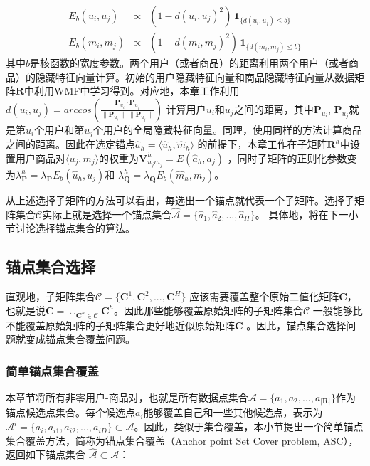 \begin{eqnarray}
	\mathit{E_{b}}(u_i, u_j)&\varpropto&(1-d(u_i,u_j)^2) \,\mathbf{1}_{\{d(u_i,u_j)\leq {b}\}}\nonumber\\
	\mathit{E_{b}}(m_i, m_j)&\varpropto&(1-d(m_i,m_j)^2) \,\mathbf{1}_{\{d(m_i,m_j)\leq {b}\}}\nonumber
\end{eqnarray}
其中$b$是核函数的宽度参数。两个用户（或者商品）的距离利用两个用户（或者商品）的隐藏特征向量计算。初始的用户隐藏特征向量和商品隐藏特征向量从数据矩阵$\mathbf{R}$中利用WMF中学习得到。对应地，本章工作利用$d(u_i, u_j)=arccos(\frac{\mathbf{P}_{u_i}\cdot \mathbf{P}_{u_j}}{\|\mathbf{P}_{u_i}\|\cdot\|\mathbf{P}_{u_j}\|})$ 计算用户$u_i$和$u_j$之间的距离，其中$\mathbf{P}_{u_i}$, $\mathbf{P}_{u_j}$就是第$u_i$个用户和第$u_j$个用户的全局隐藏特征向量。同理，使用同样的方法计算商品之间的距离。因此在选定锚点$\hat{a}_h=\langle\hat{u}_h, \hat{m}_h\rangle$ 的前提下，本章工作在子矩阵$\mathbf{R}^h$中设置用户商品对$\langle u_j,m_j \rangle$的权重为$\mathbf{V}^h_{u_jm_j} = \mathit{E}(\hat{a}_h, a_j)$ ，同时子矩阵的正则化参数变为$\lambda_\mathbf{P}^h = \lambda_\mathbf{P} \mathit{E_{b}}(\hat{u}_h, u_j)$和 $\lambda_\mathbf{Q}^h=\lambda_\mathbf{Q} \mathit{E_{b}}(\hat{m}_h, m_j)$。

从上述选择子矩阵的方法可以看出，每选出一个锚点就代表一个子矩阵。选择子矩阵集合$\mathcal{C}$实际上就是选择一个锚点集合$\hat{\mathcal{A}}=\{\hat{a}_1, \hat{a}_2, ..., \hat{a}_H\}$。 具体地，将在下一小节讨论选择锚点集合的算法。

\subsection{锚点集合选择}
\label{sec-lwmf-asc}
直观地，子矩阵集合$\mathcal{C}= \{\mathbf{C}^1,\mathbf{C}^2,...,\mathbf{C}^H\}$ 应该需要覆盖整个原始二值化矩阵$\mathbf{C}$，也就是说$\mathbf{C} = \cup_{\mathbf{C}^h\in \mathcal{C}}\mathbf{C}^h $。因此那些能够覆盖原始矩阵的子矩阵集合$\mathcal{C}$ 一般能够比不能覆盖原始矩阵的子矩阵集合更好地近似原始矩阵$\mathbf{C}$ 。因此，锚点集合选择问题就变成锚点集合覆盖问题。

\subsubsection{简单锚点集合覆盖}
\label{sec-lwmf-nasc}
本章节将所有非零用户-商品对，也就是所有数据点集合$\mathcal{A}=\{a_1,a_2,...,a_{|\mathbf{R}|}\}$作为锚点候选点集合。每个候选点$a_i$能够覆盖自己和一些其他候选点，表示为$\mathcal{A}^i=\{a_i, a_{i1}, a_{i2},..., a_{iD}\}\subset \mathcal{A}$。因此，类似于集合覆盖，本小节提出一个简单锚点集合覆盖方法，简称为锚点集合覆盖（Anchor point Set Cover problem, ASC），返回如下锚点集合
$\hat{\mathcal{A}} \subset \mathcal{A}$：

